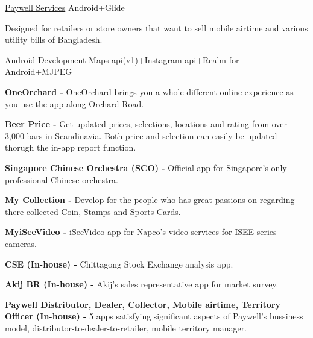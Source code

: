 \begin{projectentries}
    \projectentry 
    {\href{https://play.google.com/store/apps/details?id=com.cloudwell.paywell.services}{Paywell Services}} 
    {Android+Glide}
    {
      \begin{projectitems} %
        \item {Designed for retailers or store owners that want to sell mobile airtime and various utility bills of Bangladesh.}
      \end{projectitems}
    }

    \projectentry 
    {Android Development} 
    {Maps api(v1)+Instagram api+Realm for Android+MJPEG}
    {
      \begin{projectitems} %
        \item {{\href{https://play.google.com/store/apps/details?id=com.orba.OneOrchard}{\textbf{OneOrchard - }}}
        OneOrchard brings you a whole different online experience as you use the app along Orchard Road.}
        \item {{\href{https://annanovas.com/portfolio/beer-prices-android/}{\textbf{Beer Price - }}}
        Get updated prices, selections, locations and rating from over 3,000 bars in Scandinavia. Both price and selection can easily be 
        updated thorugh the in-app report function.}  
        \item {{\href{https://play.google.com/store/apps/details?id=com.SingaporeChineseOrchestra.SCO}{\textbf{Singapore Chinese Orchestra (SCO) - }}}
        Official app for Singapore’s only professional Chinese orchestra.}  
        \item {{\href{https://annanovas.com/portfolio/my-collection/}{\textbf{My Collection - }}}
        Develop for the people who has great passions on regarding there collected Coin, Stamps and Sports Cards.}  
        \item {{\href{https://play.google.com/store/apps/details?id=com.napco.uidealer.myiseevideo}{\textbf{MyiSeeVideo - }}}
        iSeeVideo app for Napco's video services for ISEE series cameras.}  
        \item {\textbf{CSE (In-house) - }
        Chittagong Stock Exchange analysis app.}  
        \item {\textbf{Akij BR (In-house) - }
        Akij's sales representative app for market survey.}  
        \item {\textbf{Paywell Distributor, Dealer, Collector, Mobile airtime, Territory Officer (In-house) - }
        5 apps satisfying significant aspects of Paywell's bussiness model, distributor-to-dealer-to-retailer, mobile territory manager.}  
      \end{projectitems}
    }
    


\end{projectentries}

